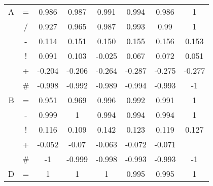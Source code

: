 \documentclass{sfuthesis}
\begin{document}
\begin{table}
\begin{tabular}{cccccccc}
			A      & \multicolumn{1}{c|}{=}      & 0.986              & 0.987               & 0.991             & 0.994          & \multicolumn{1}{c|}{0.986}              & 1             \\
			& \multicolumn{1}{c|}{/}      & 0.927              & 0.965               & 0.987             & 0.993          & \multicolumn{1}{c|}{0.99}               & 1             \\
			& \multicolumn{1}{c|}{-}      & 0.114              & 0.151               & 0.150             & 0.155          & \multicolumn{1}{c|}{0.156}              & 0.153         \\
			& \multicolumn{1}{c|}{!}      & 0.091              & 0.103               & -0.025            & 0.067          & \multicolumn{1}{c|}{0.072}              & 0.051         \\
			& \multicolumn{1}{c|}{+}      & -0.204             & -0.206              & -0.264            & -0.287         & \multicolumn{1}{c|}{-0.275}             & -0.277        \\
			& \multicolumn{1}{c|}{\#}     & -0.998             & -0.992              & -0.989            & -0.994         & \multicolumn{1}{c|}{-0.993}             & -1            \\ \hline
			B      & \multicolumn{1}{c|}{=}      & 0.951              & 0.969               & 0.996             & 0.992          & \multicolumn{1}{c|}{0.991}              & 1             \\
			& \multicolumn{1}{c|}{-}      & 0.999              & 1                   & 0.994             & 0.994          & \multicolumn{1}{c|}{0.994}              & 1             \\
			& \multicolumn{1}{c|}{!}      & 0.116              & 0.109               & 0.142             & 0.123          & \multicolumn{1}{c|}{0.119}              & 0.127         \\
			& \multicolumn{1}{c|}{+}      & -0.052             & -0.07               & -0.063            & -0.072         & \multicolumn{1}{c|}{-0.071}             &               \\
			& \multicolumn{1}{c|}{\#}     & -1                 & -0.999              & -0.998            & -0.993         & \multicolumn{1}{c|}{-0.993}             & -1            \\ \hline
			D      & \multicolumn{1}{c|}{=}      & 1                  & 1                   & 1                 & 0.995          & \multicolumn{1}{c|}{0.995}              & 1             \\

\end{tabular}
\end{table}
\end{document}
